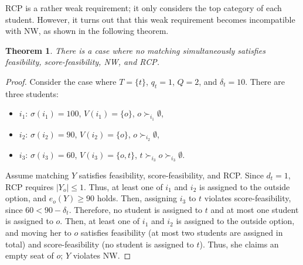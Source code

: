 \documentclass[a4paper,twoside]{article}
\newtheorem{theorem}{Theorem}
\theoremstyle{definition}
\newcommand{\zh}[1]{\textcolor{red}{\textbf{Zhaohong says:} #1}}
\begin{document}

RCP is a rather weak requirement; it only considers the top category of each student. 
However, it turns out that this weak requirement becomes incompatible 
with NW, as shown in the following theorem. 
\begin{theorem}
\label{thm:imp1}
There is a case where no matching simultaneously satisfies feasibility,
score-feasibility, NW, and RCP.
\end{theorem}
\begin{proof}
Consider the case where $T=\{t\}$, $q_t=1$, $Q=2$, and $\delta_t=10$.
There are three students:
\begin{itemize}
\item $i_1$: $\sigma(i_1)=100$, $V(i_1)=\{o\}$, $o\succ_{i_1}\emptyset$,
\item $i_2$: $\sigma(i_2)=90$, $V(i_2)=\{o\}$, $o\succ_{i_2}\emptyset$,
\item $i_3$: $\sigma(i_3)=60$, $V(i_3)=\{o,t\}$,
$t\succ_{i_3}o\succ_{i_3}\emptyset$.
\end{itemize}
Assume matching $Y$ satisfies feasibility, score-feasibility, and RCP.
Since $d_t=1$, RCP requires $|Y_o|\le 1$.
Thus, at least one of $i_1$ and $i_2$ is assigned to the outside option, and
$e_o(Y)\ge 90$ holds.
Then, assigning $i_3$ to $t$ violates score-feasibility, since $60<90-\delta_t$.
Therefore, no student is assigned to $t$ and at most one student is assigned to $o$.
Then, at least one of $i_1$ and $i_2$ is assigned to the outside option, and
moving her to $o$ satisfies feasibility (at most two students are assigned in total) and
score-feasibility (no student is assigned to $t$).
Thus, she claims an empty seat of $o$; $Y$ violates NW.
\end{proof}
\end{document}

